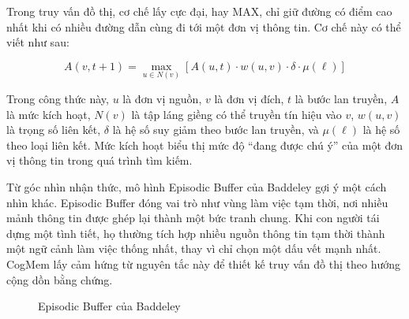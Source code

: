\documentclass[../main.tex]{subfiles}
\begin{document}
Trong truy vấn đồ thị, cơ chế lấy cực đại, hay MAX, chỉ giữ đường có điểm cao nhất khi có nhiều đường dẫn cùng đi tới một đơn vị thông tin. Cơ chế này có thể viết như sau:

\begin{equation}
A(v,t+1) = \max_{u \in N(v)}
\left[
A(u,t) \cdot w(u,v) \cdot \delta \cdot \mu(\ell)
\right]
\end{equation}

Trong công thức này, $u$ là đơn vị nguồn, $v$ là đơn vị đích, $t$ là bước lan truyền, $A$ là mức kích hoạt, $N(v)$ là tập láng giềng có thể truyền tín hiệu vào $v$, $w(u,v)$ là trọng số liên kết, $\delta$ là hệ số suy giảm theo bước lan truyền, và $\mu(\ell)$ là hệ số theo loại liên kết. Mức kích hoạt biểu thị mức độ ``đang được chú ý'' của một đơn vị thông tin trong quá trình tìm kiếm.

Từ góc nhìn nhận thức, mô hình Episodic Buffer của Baddeley gợi ý một cách nhìn khác. Episodic Buffer đóng vai trò như vùng làm việc tạm thời, nơi nhiều mảnh thông tin được ghép lại thành một bức tranh chung. Khi con người tái dựng một tình tiết, họ thường tích hợp nhiều nguồn thông tin tạm thời thành một ngữ cảnh làm việc thống nhất, thay vì chỉ chọn một dấu vết mạnh nhất. CogMem lấy cảm hứng từ nguyên tắc này để thiết kế truy vấn đồ thị theo hướng cộng dồn bằng chứng.

\begin{figure}[H]
\centering
{}
\caption{Episodic Buffer của Baddeley}
\label{fig:ch4_episodic_buffer}
\end{figure}
\end{document}
